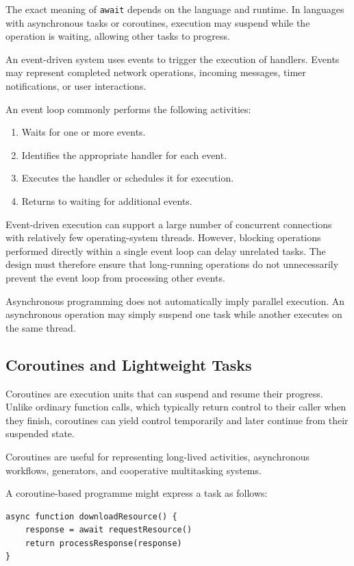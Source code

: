 The exact meaning of \texttt{await} depends on the language and runtime. In languages with asynchronous tasks or coroutines, execution may suspend while the operation is waiting, allowing other tasks to progress.

An event-driven system uses events to trigger the execution of handlers. Events may represent completed network operations, incoming messages, timer notifications, or user interactions.

An event loop commonly performs the following activities:

\begin{enumerate}
    \item Waits for one or more events.
    \item Identifies the appropriate handler for each event.
    \item Executes the handler or schedules it for execution.
    \item Returns to waiting for additional events.
\end{enumerate}

Event-driven execution can support a large number of concurrent connections with relatively few operating-system threads. However, blocking operations performed directly within a single event loop can delay unrelated tasks. The design must therefore ensure that long-running operations do not unnecessarily prevent the event loop from processing other events.

Asynchronous programming does not automatically imply parallel execution. An asynchronous operation may simply suspend one task while another executes on the same thread.

\subsection{Coroutines and Lightweight Tasks}

Coroutines are execution units that can suspend and resume their progress. Unlike ordinary function calls, which typically return control to their caller when they finish, coroutines can yield control temporarily and later continue from their suspended state.

Coroutines are useful for representing long-lived activities, asynchronous workflows, generators, and cooperative multitasking systems.

A coroutine-based programme might express a task as follows:

\begin{lstlisting}
async function downloadResource() {
    response = await requestResource()
    return processResponse(response)
}
\end{lstlisting}

